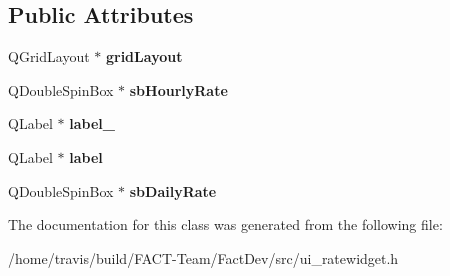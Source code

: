 \subsection*{Public Attributes}
\begin{DoxyCompactItemize}
\item 
\hypertarget{classUi__RateWidget_a1da35b235ab696627467f5f110fad250}{Q\-Grid\-Layout $\ast$ {\bfseries grid\-Layout}}\label{classUi__RateWidget_a1da35b235ab696627467f5f110fad250}

\item 
\hypertarget{classUi__RateWidget_a70a31f04171b29fdb2acb59b5ad81c16}{Q\-Double\-Spin\-Box $\ast$ {\bfseries sb\-Hourly\-Rate}}\label{classUi__RateWidget_a70a31f04171b29fdb2acb59b5ad81c16}

\item 
\hypertarget{classUi__RateWidget_a09fe420d83ff6a04087220f2b19b320c}{Q\-Label $\ast$ {\bfseries label\-\_}}\label{classUi__RateWidget_a09fe420d83ff6a04087220f2b19b320c}

\item 
\hypertarget{classUi__RateWidget_a929a0dbdae3dd5fc58765161c534d4fb}{Q\-Label $\ast$ {\bfseries label}}\label{classUi__RateWidget_a929a0dbdae3dd5fc58765161c534d4fb}

\item 
\hypertarget{classUi__RateWidget_a3f434a47e9c78acec34acdb1b6c5b3b2}{Q\-Double\-Spin\-Box $\ast$ {\bfseries sb\-Daily\-Rate}}\label{classUi__RateWidget_a3f434a47e9c78acec34acdb1b6c5b3b2}

\end{DoxyCompactItemize}


The documentation for this class was generated from the following file\-:\begin{DoxyCompactItemize}
\item 
/home/travis/build/\-F\-A\-C\-T-\/\-Team/\-Fact\-Dev/src/ui\-\_\-ratewidget.\-h\end{DoxyCompactItemize}
